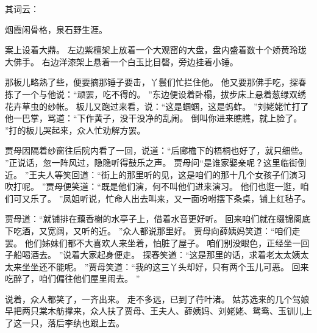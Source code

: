 其词云：\par
\hop
烟霞闲骨格，泉石野生涯。
\par
{}\par
\hop
案上设着大鼎。
左边紫檀架上放着一个大观窑的大盘，盘内盛着数十个娇黄玲珑大佛手。
右边洋漆架上悬着一个白玉比目磬，旁边挂着小锤。
\par
那板儿略熟了些，便要摘那锤子要击，丫鬟们忙拦住他。
他又要那佛手吃，探春拣了一个与他说：“顽罢，吃不得的。
”东边便设着卧榻，拔步床上悬着葱绿双绣花卉草虫的纱帐。
板儿又跑过来看，说：“这是蝈蝈，这是蚂蚱。
”刘姥姥忙打了他一巴掌，骂道：“下作黄子，没干没净的乱闹。
倒叫你进来瞧瞧，就上脸了。
”打的板儿哭起来，众人忙劝解方罢。
\par
贾母因隔着纱窗往后院内看了一回，说道：“后廊檐下的梧桐也好了，就只细些。
”正说话，忽一阵风过，隐隐听得鼓乐之声。
贾母问“是谁家娶亲呢？这里临街倒近。
”王夫人等笑回道：“街上的那里听的见，这是咱们的那十几个女孩子们演习吹打呢。
”贾母便笑道：“既是他们演，何不叫他们进来演习。
他们也逛一逛，咱们可又乐了。
”凤姐听说，忙命人出去叫来，又一面吩咐摆下条桌，铺上红毡子。
\par
贾母道：“就铺排在藕香榭的水亭子上，借着水音更好听。
回来咱们就在缀锦阁底下吃酒，又宽阔，又听的近。
”众人都说那里好。
贾母向薛姨妈笑道：“咱们走罢。
他们姊妹们都不大喜欢人来坐着，怕脏了屋子。
咱们别没眼色，正经坐一回子船喝酒去。
”说着大家起身便走。
探春笑道：“这是那里的话，求着老太太姨太太来坐坐还不能呢。
”贾母笑道：“我的这三丫头却好，只有两个玉儿可恶。
回来吃醉了，咱们偏往他们屋里闹去。
”\par
说着，众人都笑了，一齐出来。
走不多远，已到了荇叶渚。
姑苏选来的几个驾娘早把两只棠木舫撑来，众人扶了贾母、王夫人、薛姨妈、刘姥姥、鸳鸯、玉钏儿上了这一只，落后李纨也跟上去。
